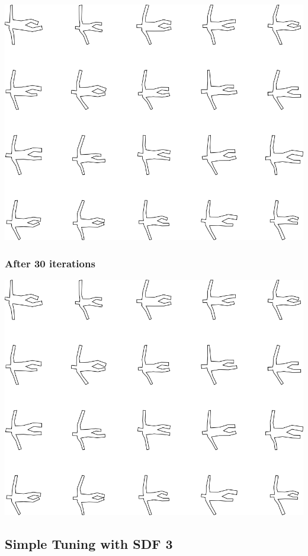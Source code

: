 \includegraphics[width=6in]{output/3.learning/simple_tuning/simple_tuning_iter20_.png}
\subsubsection{After 30 iterations}

\includegraphics[width=6in]{output/3.learning/simple_tuning/simple_tuning_iter30_.png}
\subsection{Simple Tuning with SDF 3}

